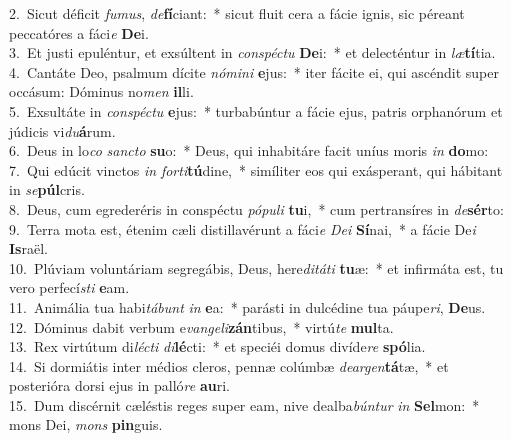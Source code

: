 {2.~}Sicut déficit \textit{fu}\textit{mus}, \textit{de}\textbf{fí}ciant:~* sicut fluit cera a fácie ignis, sic péreant peccatóres a fáci\textit{e} \textbf{De}i.\\
{3.~}Et justi epuléntur, et exsúltent in \textit{con}\textit{spé}\textit{ctu} \textbf{De}i:~* et delecténtur in \textit{læ}\textbf{tí}tia.\\
{4.~}Cantáte Deo, psalmum dícite \textit{nó}\textit{mi}\textit{ni} \textbf{e}jus:~* iter fácite ei, qui ascéndit super occásum: Dóminus no\textit{men} \textbf{il}li.\\
{5.~}Exsultáte in \textit{con}\textit{spé}\textit{ctu} \textbf{e}jus:~* turbabúntur a fácie ejus, patris orphanórum et júdicis vi\textit{du}\textbf{á}rum.\\
{6.~}Deus in lo\textit{co} \textit{san}\textit{cto} \textbf{su}o:~* Deus, qui inhabitáre facit uníus moris \textit{in} \textbf{do}mo:\\
{7.~}Qui edúcit vinctos \textit{in} \textit{for}\textit{ti}\textbf{tú}dine,~* simíliter eos qui exásperant, qui hábitant in \textit{se}\textbf{púl}cris.\\
{8.~}Deus, cum egrederéris in conspéctu \textit{pó}\textit{pu}\textit{li} \textbf{tu}i,~* cum pertransíres in \textit{de}\textbf{sér}to:\\
{9.~}Terra mota est, étenim cæli distillavérunt a fáci\textit{e} \textit{De}\textit{i} \textbf{Sí}nai,~* a fácie De\textit{i} \textbf{Is}raël.\\
{10.~}Plúviam voluntáriam segregábis, Deus, here\textit{di}\textit{tá}\textit{ti} \textbf{tu}æ:~* et infirmáta est, tu vero perfecí\textit{sti} \textbf{e}am.\\
{11.~}Animália tua habi\textit{tá}\textit{bunt} \textit{in} \textbf{e}a:~* parásti in dulcédine tua páupe\textit{ri}, \textbf{De}us.\\
{12.~}Dóminus dabit verbum e\textit{van}\textit{ge}\textit{li}\textbf{zán}tibus,~* virtú\textit{te} \textbf{mul}ta.\\
{13.~}Rex virtútum di\textit{lé}\textit{cti} \textit{di}\textbf{lé}cti:~* et speciéi domus divíde\textit{re} \textbf{spó}lia.\\
{14.~}Si dormiátis inter médios cleros, pennæ colúmbæ \textit{de}\textit{ar}\textit{gen}\textbf{tá}tæ,~* et posterióra dorsi ejus in palló\textit{re} \textbf{au}ri.\\
{15.~}Dum discérnit cæléstis reges super eam, nive dealba\textit{bún}\textit{tur} \textit{in} \textbf{Sel}mon:~* mons Dei, \textit{mons} \textbf{pin}guis.\\
